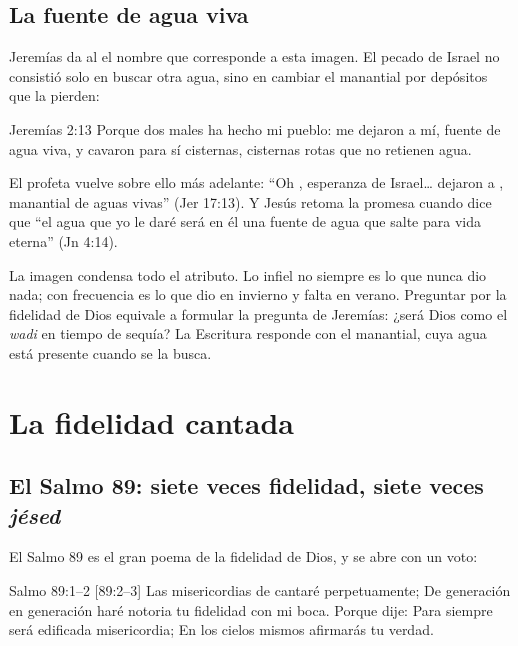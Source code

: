 \subsection{La fuente de agua viva}
Jeremías da al \SENOR{} el nombre que corresponde a esta imagen. El pecado de Israel no consistió solo en buscar otra agua, sino en cambiar el manantial por depósitos que la pierden:

\begin{verso}{Jeremías 2:13}
Porque dos males ha hecho mi pueblo: me dejaron a mí, fuente de agua viva, y cavaron para sí cisternas, cisternas rotas que no retienen agua.
\end{verso}

El profeta vuelve sobre ello más adelante: ``Oh \SENOR, esperanza de Israel\ldots{} dejaron a \SENOR, manantial de aguas vivas'' (Jer 17:13). Y Jesús retoma la promesa cuando dice que ``el agua que yo le daré será en él una fuente de agua que salte para vida eterna'' (Jn 4:14).

La imagen condensa todo el atributo. Lo infiel no siempre es lo que nunca dio nada; con frecuencia es lo que dio en invierno y falta en verano. Preguntar por la fidelidad de Dios equivale a formular la pregunta de Jeremías: ¿será Dios como el \emph{wadi} en tiempo de sequía? La Escritura responde con el manantial, cuya agua está presente cuando se la busca.


\section{La fidelidad cantada}

\subsection{El Salmo 89: siete veces fidelidad, siete veces \emph{jésed}}
El Salmo 89 es el gran poema de la fidelidad de Dios, y se abre con un voto:

\begin{verso}{Salmo 89:1–2 [89:2–3]}
Las misericordias de \SENOR{} cantaré perpetuamente; De generación en generación haré notoria tu fidelidad con mi boca. Porque dije: Para siempre será edificada misericordia; En los cielos mismos afirmarás tu verdad.
\end{verso}

